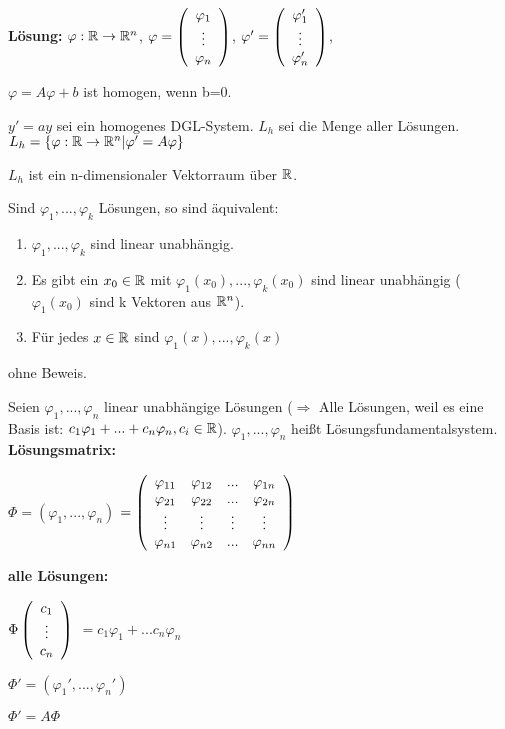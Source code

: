 \textbf{Lösung:} $\varphi: \mathbb{R} \rightarrow \mathbb{R}^n$,
$ \varphi =   \left(  \begin{array}{c} \varphi_1\\\vdots\\\varphi_n \end{array}  \right)  $,
$ \varphi' =   \left(  \begin{array}{c} \varphi_1'\\\vdots\\\varphi_n' \end{array}  \right)  $,

$\varphi = A \varphi + b$ ist homogen, wenn b=0.

\begin{satz}
$y' = ay$ sei ein homogenes DGL-System. 
$L_h$ sei die Menge aller Lösungen. 
$L_h =  \left\lbrace \varphi : \mathbb{R} \rightarrow \mathbb{R}^n | \varphi' = A \varphi \right\rbrace $

$L_h$ ist ein n-dimensionaler Vektorraum über $\mathbb{R}$. 

Sind $\varphi_1, ..., \varphi_k$ Lösungen, so sind äquivalent:
\begin{enumerate}
\item $\varphi_1, ..., \varphi_k$ sind linear unabhängig. 
\item Es gibt ein $x_0 \in \mathbb{R} $ mit $\varphi_1(x_0), ..., \varphi_k(x_0)$ sind linear unabhängig ($\varphi_1(x_0)$ sind k Vektoren aus $\mathbb{R}^n $).
\item Für jedes $x\in\mathbb{R} $ sind $\varphi_1(x), ..., \varphi_k(x)$ 
\end{enumerate}
ohne Beweis.
\end{satz}

\begin{defi}
Seien $\varphi_1, ..., \varphi_n$ linear unabhängige Lösungen ($\Rightarrow$ Alle Lösungen, weil es eine Basis ist: 
$ c_1 \varphi_1 + ... + c_n \varphi_n, c_i\in\mathbb{R}$). $\varphi_1, ..., \varphi_n$ heißt Lösungsfundamentalsystem. \\

\textbf{Lösungsmatrix:}

$\Phi = (\varphi_1, ..., \varphi_n)$
$= \left( 
\begin{array}{cccc}
\varphi_{11} & \varphi_{12} & ... & \varphi_{1n} \\ 
\varphi_{21} & \varphi_{22} & ... & \varphi_{2n} \\ 
\vdots & \vdots & \vdots & \vdots \\ 
\varphi_{n1} & \varphi_{n2} & ... & \varphi_{nn}
\end{array} 
 \right) 
$

\textbf{alle Lösungen:}

$\Phi   \left(  \begin{array}{c} c_1\\\vdots\\c_n \end{array}  \right)  $
$=c_1 \varphi_1 + ... c_n \varphi_n$

$\Phi' = (\varphi_1', ..., \varphi_n')$

$\Phi' = A \Phi$

\end{defi}

